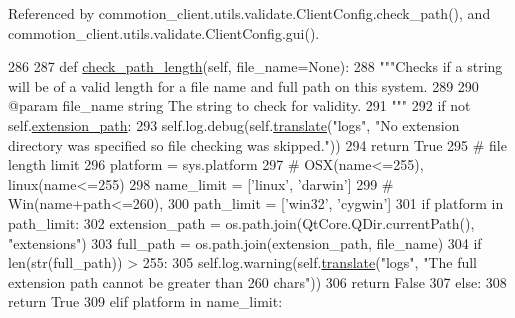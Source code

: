 Referenced by commotion\+\_\+client.\+utils.\+validate.\+Client\+Config.\+check\+\_\+path(), and commotion\+\_\+client.\+utils.\+validate.\+Client\+Config.\+gui().


\begin{DoxyCode}
286 
287     \textcolor{keyword}{def }\hyperlink{classcommotion__client_1_1utils_1_1validate_1_1ClientConfig_af89fc4407c4af2d96ad0146b1249a272}{check\_path\_length}(self, file\_name=None):
288         \textcolor{stringliteral}{"""Checks if a string will be of a valid length for a file name and full path on this system.}
289 \textcolor{stringliteral}{}
290 \textcolor{stringliteral}{        @param file\_name string The string to check for validity.}
291 \textcolor{stringliteral}{        """}
292         \textcolor{keywordflow}{if} \textcolor{keywordflow}{not} self.\hyperlink{classcommotion__client_1_1utils_1_1validate_1_1ClientConfig_a422e4fea49a7e582749c0e0c6d11e2d9}{extension\_path}:
293             self.log.debug(self.\hyperlink{classcommotion__client_1_1utils_1_1validate_1_1ClientConfig_a12d19377a853ce92cc0e0d758acdd804}{translate}(\textcolor{stringliteral}{"logs"}, \textcolor{stringliteral}{"No extension directory was specified so file
       checking was skipped."}))
294             \textcolor{keywordflow}{return} \textcolor{keyword}{True}
295         \textcolor{comment}{# file length limit}
296         platform = sys.platform
297         \textcolor{comment}{# OSX(name<=255),  linux(name<=255)}
298         name\_limit = [\textcolor{stringliteral}{'linux'}, \textcolor{stringliteral}{'darwin'}]
299         \textcolor{comment}{# Win(name+path<=260),}
300         path\_limit = [\textcolor{stringliteral}{'win32'}, \textcolor{stringliteral}{'cygwin'}]
301         \textcolor{keywordflow}{if} platform \textcolor{keywordflow}{in} path\_limit:
302             extension\_path = os.path.join(QtCore.QDir.currentPath(), \textcolor{stringliteral}{"extensions"})
303             full\_path = os.path.join(extension\_path, file\_name)
304             \textcolor{keywordflow}{if} len(str(full\_path)) > 255:
305                 self.log.warning(self.\hyperlink{classcommotion__client_1_1utils_1_1validate_1_1ClientConfig_a12d19377a853ce92cc0e0d758acdd804}{translate}(\textcolor{stringliteral}{"logs"}, \textcolor{stringliteral}{"The full extension path cannot be greater
       than 260 chars"}))
306                 \textcolor{keywordflow}{return} \textcolor{keyword}{False}
307             \textcolor{keywordflow}{else}:
308                 \textcolor{keywordflow}{return} \textcolor{keyword}{True}
309         \textcolor{keywordflow}{elif} platform \textcolor{keywordflow}{in} name\_limit:

\end{DoxyCode}
